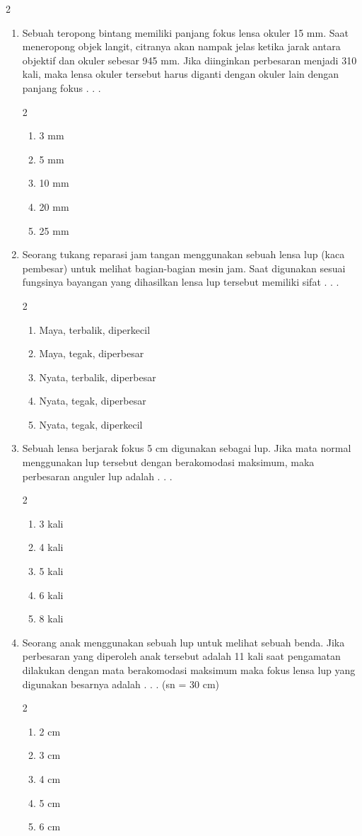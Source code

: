 \documentclass[10pt,a4paper]{extarticle}
\newcommand{\pilgani}[1]{                            \vspace{-0.3cm}\begin{multicols}{2}
 \begin{enumerate}[label=\Alph*., itemsep=0pt,topsep=0pt,leftmargin=*,align=Center]#1                     \end{enumerate}
 \phantom{ini cuma sapi, wedus, dan ayam}
 \end{multicols}}
\begin{document}
\begin{multicols*}{2}
\begin{enumerate}
\item Sebuah teropong bintang memiliki panjang fokus lensa okuler 15 mm. Saat meneropong objek langit, citranya akan nampak jelas ketika jarak antara objektif dan okuler sebesar 945 mm. Jika diinginkan perbesaran menjadi 310 kali, maka lensa okuler tersebut harus diganti dengan okuler lain dengan panjang fokus . . . 
\pilgani{
	\item 3 mm
	\item 5 mm
	\item 10 mm
	\item 20 mm
	\item 25 mm
}
\vspace{3cm}


\item Seorang tukang reparasi jam tangan menggunakan  sebuah lensa lup (kaca pembesar)  untuk melihat bagian-bagian mesin jam. Saat digunakan sesuai fungsinya bayangan yang dihasilkan lensa lup tersebut  memiliki sifat . . .
\pilgani{
	\item Maya, terbalik, diperkecil
	\item Maya, tegak, diperbesar
	\item Nyata, terbalik, diperbesar
	\item Nyata, tegak, diperbesar
	\item Nyata, tegak, diperkecil
}
\vspace{2cm}

\item Sebuah lensa berjarak fokus 5 cm digunakan sebagai lup. Jika mata normal menggunakan lup tersebut dengan berakomodasi maksimum, maka perbesaran anguler lup adalah . . . 
\pilgani{
	\item 3 kali
	\item 4 kali
	\item 5 kali
	\item 6 kali
	\item 8 kali }
\vspace{2cm}

\item Seorang anak menggunakan sebuah lup untuk melihat sebuah benda. Jika perbesaran yang diperoleh anak tersebut adalah 11 kali saat pengamatan dilakukan dengan mata berakomodasi maksimum maka fokus lensa lup yang digunakan besarnya adalah . . . (sn = 30 cm)
\pilgani{
	\item 2 cm
	\item 3 cm
	\item 4 cm
	\item 5 cm
	\item 6 cm }
\vspace{2cm}


\end{enumerate}
\end{multicols*}
\end{document}
